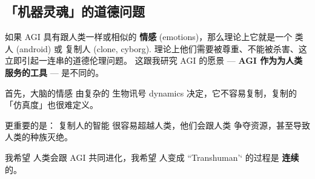 \begin{preview}
\begin{minipage}{\textwidth}
\section{「机器灵魂」的道德问题}

如果 AGI 具有跟人类一样或相似的 \textbf{情感} (emotions)，那么理论上它就是一个 类人 (android) 或 复制人 (clone, cyborg).  理论上他们需要被尊重、不能被杀害、这立即引起一连串的道德伦理问题。 这跟我研究 AGI 的愿景 --- \textbf{AGI 作为为人类服务的工具} --- 是不同的。 

首先，大脑的情感 由复杂的 生物讯号 dynamics 决定，它不容易复制，复制的「仿真度」也很难定义。

更重要的是： 复制人的智能 很容易超越人类，他们会跟人类 争夺资源，甚至导致人类的种族灭绝。

我希望 人类会跟 AGI 共同进化，我希望 人变成 ``Transhuman’‘ 的过程是 \textbf{连续}的。

\end{minipage}
\end{preview}

